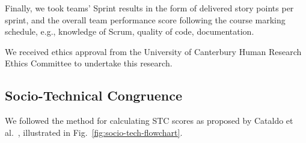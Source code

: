 Finally, we took teams' Sprint results in the form of delivered story points per sprint, and the overall team performance score following the course marking schedule, e.g., knowledge of Scrum, quality of code, documentation.


We received ethics approval from the University of Canterbury Human Research Ethics Committee to undertake this research.


\subsection{Socio-Technical Congruence}
We followed the method for calculating STC scores as proposed by Cataldo et al.~\cite{cataldoIdentificationCoordinationRequirements2006}, illustrated in Fig.~\ref{fig:socio-tech-flowchart}. 

